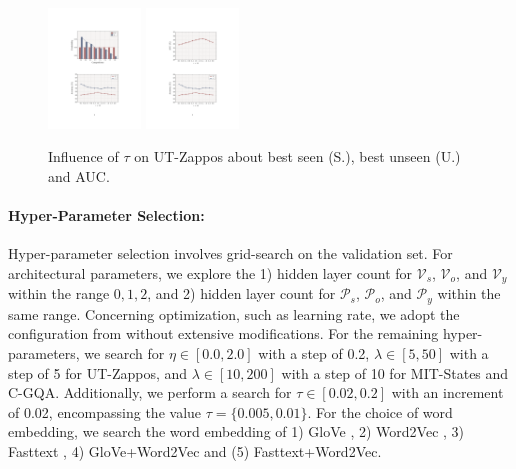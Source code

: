 \documentclass[letterpaper]{article} %
\theoremstyle{definition}
\begin{document}
  \begin{figure}[t]
	\centering
		\subfigure
		{
			\includegraphics[width=0.22\textwidth]{ FIG_HYPER_5.pdf}
		}
  		\subfigure
		{
			\includegraphics[width=0.22\textwidth]{ FIG_HYPER_6.pdf}
		}
	\caption{Influence of $\tau$ on UT-Zappos about best seen (S.), best unseen (U.) and AUC.}
	\label{subfig_hyper}
\end{figure}

\paragraph{Hyper-Parameter Selection:}
Hyper-parameter selection involves grid-search on the validation set. For architectural parameters, we explore the 1) hidden layer count for $\mathcal{V}_{s}$, $\mathcal{V}_{o}$, and $\mathcal{V}_{y}$ within the range ${0,1,2}$, and 2) hidden layer count for $\mathcal{P}_{s}$, $\mathcal{P}_{o}$, and $\mathcal{P}_{y}$ within the same range. Concerning optimization, such as learning rate, we adopt the configuration from \citet{naeem2021learning} without extensive modifications. For the remaining hyper-parameters, we search for $\eta\in [0.0,2.0]$ with a step of 0.2, $\lambda \in [5,50]$ with a step of 5 for UT-Zappos, and $\lambda \in [10,200]$ with a step of 10 for MIT-States and C-GQA. Additionally, we perform a search for $\tau \in [0.02,0.2]$ with an increment of 0.02, encompassing the value $\tau=\{0.005,0.01\}$. For the choice of word embedding, we search the word embedding of 1) GloVe \cite{glove}, 2) Word2Vec \cite{mikolov2013distributed}, 3) Fasttext \cite{fasttext}, 4) GloVe+Word2Vec and (5) Fasttext+Word2Vec.
\end{document}
